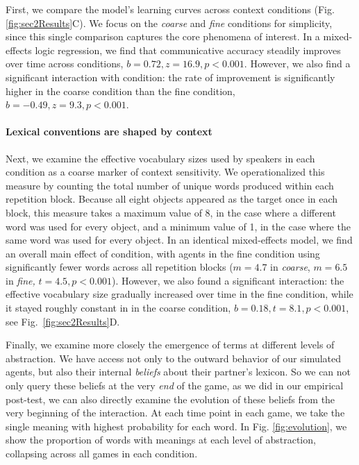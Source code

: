 First, we compare the model's learning curves across context conditions (Fig. \ref{fig:sec2Results}C). 
We focus on the \emph{coarse} and \emph{fine} conditions for simplicity, since this single comparison captures the core phenomena of interest.
In a mixed-effects logic regression, we find that communicative accuracy steadily improves over time across conditions, $b=0.72, z = 16.9, p<0.001$.
However, we also find a significant interaction with condition: the rate of improvement is significantly higher in the coarse condition than the fine condition, $b=-0.49, z=9.3, p <0.001$. 

\paragraph{Lexical conventions are shaped by context}

Next, we examine the effective vocabulary sizes used by speakers in each condition as a coarse marker of context sensitivity. 
We operationalized this measure by counting the total number of unique words produced within each repetition block.
Because all eight objects appeared as the target once in each block, this measure takes a maximum value of 8, in the case where a different word was used for every object, and a minimum value of 1, in the case where the same word was used for every object.
In an identical mixed-effects model, we find an overall main effect of condition, with agents in the fine condition using significantly fewer words across all repetition blocks ($m = 4.7$ in \emph{coarse}, $m=6.5$ in \emph{fine,} $t = 4.5, p < 0.001$).
However, we also found a significant interaction: the effective vocabulary size gradually increased over time in the fine condition, while it stayed roughly constant in in the coarse condition, $b = 0.18, t = 8.1, p < 0.001$, see Fig.~\ref{fig:sec2Results}D.

Finally, we examine more closely the emergence of terms at different levels of abstraction.
We have access not only to the outward behavior of our simulated agents, but also their internal \emph{beliefs} about their partner's lexicon.
So we can not only query these beliefs at the very \emph{end} of the game, as we did in our empirical post-test, we can also directly examine the evolution of these beliefs from the very beginning of the interaction.
At each time point in each game, we take the single meaning with highest probability for each word.
In Fig. \ref{fig:evolution}, we show the proportion of words with meanings at each level of abstraction, collapsing across all games in each condition.

